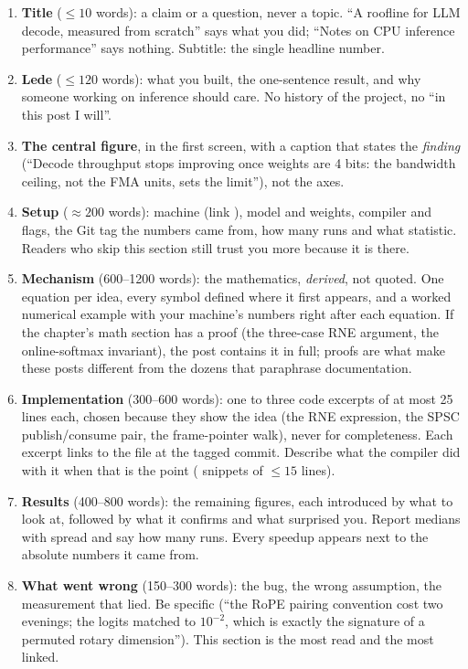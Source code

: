\begin{enumerate}
  \item \textbf{Title} ($\le 10$ words): a claim or a question, never a topic. ``A roofline for LLM decode, measured from scratch'' says what you did; ``Notes on CPU inference performance'' says nothing. Subtitle: the single headline number.
  \item \textbf{Lede} ($\le 120$ words): what you built, the one-sentence result, and why someone working on inference should care. No history of the project, no ``in this post I will''.
  \item \textbf{The central figure}, in the first screen, with a caption that states the \emph{finding} (``Decode throughput stops improving once weights are 4 bits: the bandwidth ceiling, not the FMA units, sets the limit''), not the axes.
  \item \textbf{Setup} ($\approx 200$ words): machine (link ), model and weights, compiler and flags, the Git tag the numbers came from, how many runs and what statistic. Readers who skip this section still trust you more because it is there.
  \item \textbf{Mechanism} (600--1200 words): the mathematics, \emph{derived}, not quoted. One equation per idea, every symbol defined where it first appears, and a worked numerical example with your machine's numbers right after each equation. If the chapter's math section has a proof (the three-case RNE argument, the online-softmax invariant), the post contains it in full; proofs are what make these posts different from the dozens that paraphrase documentation.
  \item \textbf{Implementation} (300--600 words): one to three code excerpts of at most 25 lines each, chosen because they show the idea (the RNE expression, the SPSC publish/consume pair, the frame-pointer walk), never for completeness. Each excerpt links to the file at the tagged commit. Describe what the compiler did with it when that is the point ( snippets of $\le 15$ lines).
  \item \textbf{Results} (400--800 words): the remaining figures, each introduced by what to look at, followed by what it confirms and what surprised you. Report medians with spread and say how many runs. Every speedup appears next to the absolute numbers it came from.
  \item \textbf{What went wrong} (150--300 words): the bug, the wrong assumption, the measurement that lied. Be specific (``the RoPE pairing convention cost two evenings; the logits matched to $10^{-2}$, which is exactly the signature of a permuted rotary dimension''). This section is the most read and the most linked.

\end{enumerate}

